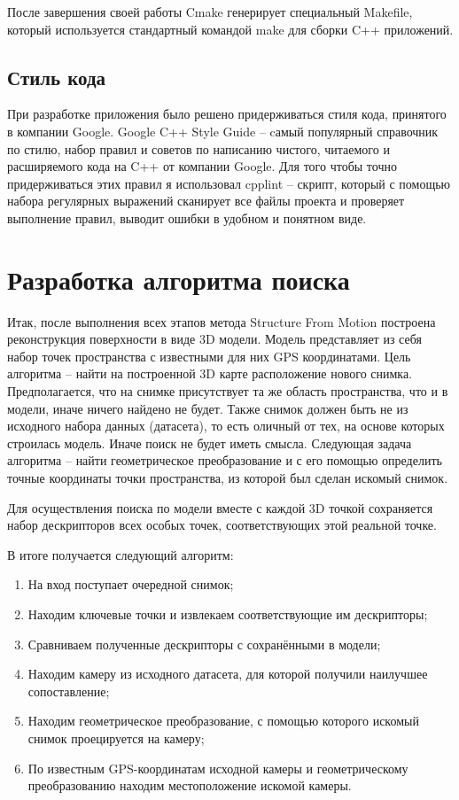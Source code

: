 После завершения своей работы Cmake генерирует специальный Makefile, который используется стандартный командой make для сборки C++ приложений.

\subsection{Стиль кода}
При разработке приложения было решено придерживаться стиля кода, принятого в компании Google. Google C++ Style Guide -- cамый популярный справочник по стилю, набор правил и советов по написанию чистого, читаемого и расширяемого кода на C++ от компании Google. Для того чтобы точно придерживаться этих правил я использовал cpplint -- скрипт, который с помощью набора регулярных выражений сканирует все файлы проекта и проверяет выполнение правил, выводит ошибки в удобном и понятном виде.

\section{Разработка алгоритма поиска}
Итак, после выполнения всех этапов метода Structure From Motion построена реконструкция поверхности в виде 3D модели. Модель представляет из себя набор точек пространства с известными для них GPS координатами. Цель алгоритма -- найти на построенной 3D карте расположение нового снимка. Предполагается, что на снимке присутствует та же область пространства, что и в модели, иначе ничего найдено не будет. Также снимок должен быть не из исходного набора данных (датасета), то есть оличный от тех, на основе которых строилась модель. Иначе поиск не будет иметь смысла. Следующая задача алгоритма -- найти геометрическое преобразование и с его помощью определить точные координаты точки пространства, из которой был сделан искомый снимок.

Для осуществления поиска по модели вместе с каждой 3D точкой сохраняется набор дескрипторов всех особых точек, соответствующих этой реальной точке.

В итоге получается следующий алгоритм:
\begin{enumerate}
    \item На вход поступает очередной снимок;
    \item Находим ключевые точки и извлекаем соответствующие им дескрипторы;
    \item Сравниваем полученные дескрипторы с сохранёнными в модели;
    \item Находим камеру из исходного датасета, для которой получили наилучшее сопоставление;
    \item Находим геометрическое преобразование, с помощью которого искомый снимок проецируется на  камеру;
    \item По известным GPS-координатам исходной камеры и геометрическому преобразованию находим местоположение искомой камеры.
\end{enumerate}

